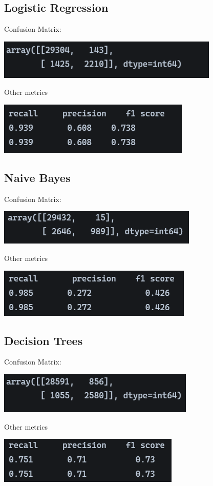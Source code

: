 \documentclass[11pt]{article}
\begin{document}
\subsection{Logistic Regression}
Confusion Matrix:
\begin{center}
	\includegraphics[scale=0.75]{figs/conf_LR.png}
\end{center}
Other metrics
\begin{center}
	\includegraphics[scale=0.75]{figs/rpf_LR.png}	
\end{center}

\subsection{Naive Bayes}
Confusion Matrix:
\begin{center}
	\includegraphics[scale=0.75]{figs/conf_NB.png}
\end{center}
Other metrics
\begin{center}
	\includegraphics[scale=0.75]{figs/rpf_NBB.png}	
\end{center}

\subsection{Decision Trees}
Confusion Matrix:
\begin{center}
	\includegraphics[scale=0.75]{figs/conf_DT.png}
\end{center}
Other metrics
\begin{center}
	\includegraphics[scale=0.75]{figs/rpf_DT.png}	
\end{center}
\end{document}
